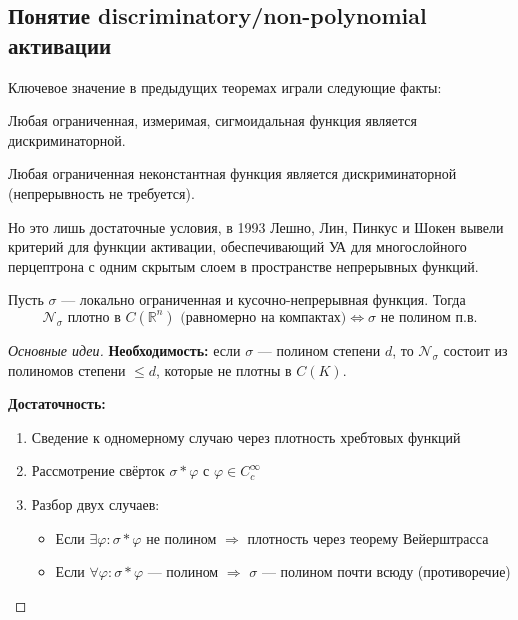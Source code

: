 \documentclass[../NDCNNAI_main.tex]{subfiles}
\begin{document}
\subsection{Понятие discriminatory/non-polynomial активации}
Ключевое значение в предыдущих теоремах играли следующие факты:

\begin{lemma}[Цыбенко]
Любая ограниченная, измеримая, сигмоидальная функция является дискриминаторной.
\end{lemma}

\begin{lemma}[Хорник]
\label{lem:hornik}
Любая ограниченная неконстантная функция является дискриминаторной (непрерывность не требуется).
\end{lemma}
Но это лишь достаточные условия, в 1993 Лешно, Лин, Пинкус и Шокен вывели критерий для функции активации, обеспечивающий УА для многослойного перцептрона с одним скрытым слоем в пространстве непрерывных функций.

\begin{theorem}[LLPS]
Пусть $\sigma$ — локально ограниченная и кусочно-непрерывная функция. Тогда
\[
\mathcal{N}_\sigma \text{ плотно в } C(\mathbb{R}^n) \text{ (равномерно на компактах)} \iff \sigma \text{ не полином п.в.} \]
\end{theorem}

\begin{proof}[Основные идеи]
\textbf{Необходимость:} если $\sigma$ — полином степени $d$, то $\mathcal{N}_\sigma$ состоит из полиномов степени $\leq d$, которые не плотны в $C(K)$.

\textbf{Достаточность:}
\begin{enumerate}[label=\arabic*)]
    \item Сведение к одномерному случаю через плотность хребтовых функций
    \item Рассмотрение свёрток $\sigma * \varphi$ с $\varphi \in C_c^\infty$
    \item Разбор двух случаев:
    \begin{itemize}
        \item Если $\exists \varphi: \sigma * \varphi$ не полином $\Rightarrow$ плотность через теорему Вейерштрасса
        \item Если $\forall \varphi: \sigma * \varphi$ --- полином $\Rightarrow$ $\sigma$ — полином почти всюду (противоречие)
    \end{itemize}
\end{enumerate}
\end{proof}
\end{document}
